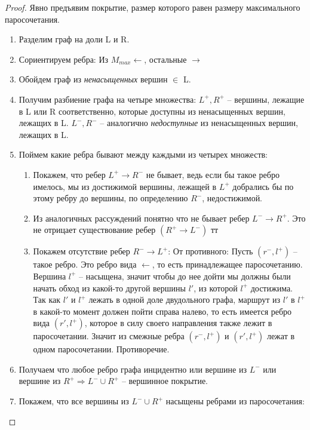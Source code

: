 \begin{proof} 
	Явно предъявим покрытие, размер которого равен размеру максимального паросочетания.
	\begin{enumerate}
		\item Разделим граф на доли L и R.
		\item Сориентируем ребра: Из $M_{max} \longleftarrow$, остальные $\longrightarrow$
		\item Обойдем граф из \textit{ненасыщенных} вершин $\in$ L.
		\item Получим разбиение графа на четыре множества: 
		$L^+, R^+$ -- вершины, лежащие в L или R соответственно, которые доступны из ненасыщенных вершин, лежащих в L. 
		$L^-, R ^-$ -- аналогично \textit{недоступные} из ненасыщенных вершин, лежащих в L. 
		\item Поймем какие ребра бывают между каждыми из четырех множеств:
		\begin{enumerate}
			\item Покажем, что ребер $L^+ \rightarrow R^-$ не бывает, ведь если бы такое ребро имелось, мы из достижимой вершины, лежащей в $L^+$ добрались бы по этому ребру до вершины, по определению $R^-$, недостижимой. 
			\item Из аналогичных рассуждений понятно что не бывает ребер $L^- \rightarrow R^+$. Это не отрицает существование ребер $(R^+ \rightarrow L^-)$
		тт	\item Покажем отсутствие ребер $R^- \rightarrow L^+$:
		От противного: Пусть  $(r^-, l^+)$ -- такое ребро. Это ребро вида  $\longleftarrow$, то есть принадлежащее паросочетанию.\\
		Вершина $l^+$ -- насыщена, значит чтобы до нее дойти мы должны были начать обход из какой-то другой вершины  $l'$, из которой $l^+$ достижима.\\
		Так как  $l'$ и $l^+$ лежать в одной доле двудольного графа, маршрут из $l'$ в $l^+$ в какой-то момент должен пойти справа налево, то есть имеется ребро вида $(r', l^+)$, которое в силу своего направления также лежит в паросочетании. Значит из смежные ребра  $(r^-, l^+)$ и  $(r', l^+)$ лежат в одном паросочетании. Противоречие.\\
		\end{enumerate}
		\item Получаем что любое ребро графа инцидентно или вершине из $L^-$ или вершине из $R^+ \Rightarrow L^- \cup R^+$ -- вершинное покрытие.
		\item Покажем, что все вершины из $L^- \cup R^+$ насыщены ребрами из паросочетания:\\

\end{enumerate}
\end{proof}
